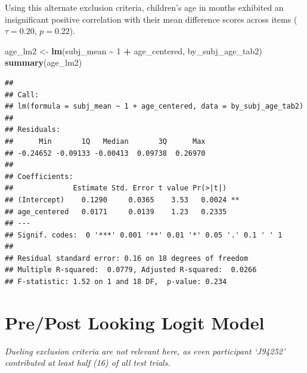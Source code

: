 \documentclass[
  doc,floatsintext]{apa6}
\newenvironment{Shaded}{\begin{snugshade}}{\end{snugshade}}
\newcommand{\DecValTok}[1]{\textcolor[rgb]{0.00,0.00,0.81}{#1}}
\newcommand{\FunctionTok}[1]{\textcolor[rgb]{0.13,0.29,0.53}{\textbf{#1}}}
\newcommand{\NormalTok}[1]{#1}
\newcommand{\OtherTok}[1]{\textcolor[rgb]{0.56,0.35,0.01}{#1}}
\newcommand{\SpecialCharTok}[1]{\textcolor[rgb]{0.81,0.36,0.00}{\textbf{#1}}}
\begin{document}
Using this alternate exclusion criteria, children's age in months exhibited an insignificant positive correlation with their mean difference scores across items (\(\tau=0.20\), \(p=0.22\)).

\begin{Shaded}
\begin{Highlighting}[]
\NormalTok{age\_lm2  }\OtherTok{\textless{}{-}} \FunctionTok{lm}\NormalTok{(subj\_mean }\SpecialCharTok{\textasciitilde{}} \DecValTok{1} \SpecialCharTok{+}\NormalTok{ age\_centered, by\_subj\_age\_tab2)}
\FunctionTok{summary}\NormalTok{(age\_lm2)}
\end{Highlighting}
\end{Shaded}

\begin{verbatim}
## 
## Call:
## lm(formula = subj_mean ~ 1 + age_centered, data = by_subj_age_tab2)
## 
## Residuals:
##      Min       1Q   Median       3Q      Max 
## -0.24652 -0.09133 -0.00413  0.09738  0.26970 
## 
## Coefficients:
##              Estimate Std. Error t value Pr(>|t|)   
## (Intercept)    0.1290     0.0365    3.53   0.0024 **
## age_centered   0.0171     0.0139    1.23   0.2335   
## ---
## Signif. codes:  0 '***' 0.001 '**' 0.01 '*' 0.05 '.' 0.1 ' ' 1
## 
## Residual standard error: 0.16 on 18 degrees of freedom
## Multiple R-squared:  0.0779, Adjusted R-squared:  0.0266 
## F-statistic: 1.52 on 1 and 18 DF,  p-value: 0.234
\end{verbatim}

\section{Pre/Post Looking Logit Model}\label{prepost-looking-logit-model}

\emph{Dueling exclusion criteria are not relevant here, as even participant `J94252' contributed at least half (16) of all test trials.}
\end{document}
